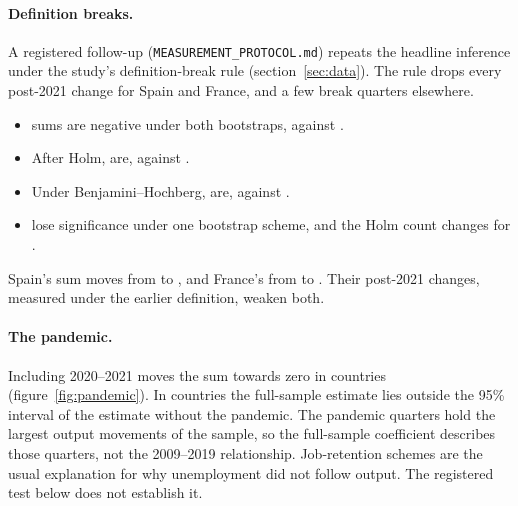 \paragraph{Definition breaks.} A registered follow-up
(\texttt{MEASUREMENT\_PROTOCOL.md}) repeats the headline inference under the study's
definition-break rule (section~\ref{sec:data}). The rule drops every post-2021 change for
Spain and France, and a few break quarters elsewhere.
\begin{itemize}
  \item {} sums are negative under both bootstraps, against
    .
  \item After Holm,  are, against .
  \item Under Benjamini--Hochberg,  are, against
    .
  \item {} lose significance under one bootstrap scheme, and the Holm
    count changes for .
\end{itemize}
Spain's sum moves from  to , and France's from
 to . Their post-2021 changes, measured under the earlier
definition, weaken both.

\paragraph{The pandemic.} Including 2020--2021 moves the sum towards zero in
 countries (figure~\ref{fig:pandemic}). In 
countries the full-sample estimate lies outside the 95\% interval of the estimate without
the pandemic. The pandemic quarters hold the largest output movements of the sample, so
the full-sample coefficient describes those quarters, not the 2009--2019 relationship.
Job-retention schemes are the usual explanation for why unemployment did not follow
output. The registered test below does not establish it.

